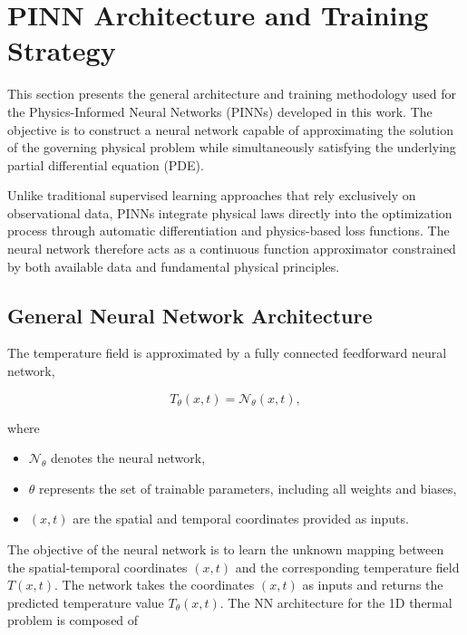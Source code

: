 \section{PINN Architecture and Training Strategy}

This section presents the general architecture and training methodology used for the Physics-Informed Neural Networks (PINNs) developed in this work. The objective is to construct a neural network capable of approximating the solution of the governing physical problem while simultaneously satisfying the underlying partial differential equation (PDE).

Unlike traditional supervised learning approaches that rely exclusively on observational data, PINNs integrate physical laws directly into the optimization process through automatic differentiation and physics-based loss functions. The neural network therefore acts as a continuous function approximator constrained by both available data and fundamental physical principles.

\subsection{General Neural Network Architecture}

The temperature field is approximated by a fully connected feedforward neural network,

\begin{equation}
T_{\theta}(x,t) = \mathcal{N}_{\theta}(x,t),
\end{equation}

where

\begin{itemize}
\item $\mathcal{N}_{\theta}$ denotes the neural network,
\item $\theta$ represents the set of trainable parameters, including all weights and biases,
\item $(x,t)$ are the spatial and temporal coordinates provided as inputs.
\end{itemize}

The objective of the neural network is to learn the unknown mapping between the spatial-temporal coordinates $(x,t)$ and the corresponding temperature field $T(x,t)$. The network takes the coordinates $(x,t)$ as inputs and returns the predicted temperature value $T_{\theta}(x,t)$. The NN architecture for the 1D thermal problem is composed of

